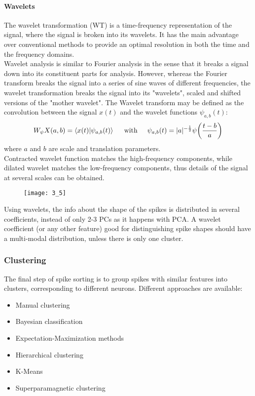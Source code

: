 \paragraph{Wavelets}
The wavelet transformation (WT) is a time-frequency representation of the signal, where the signal is broken into its wavelets. It has the main advantage over conventional methods to provide an optimal resolution in both the time and the frequency domains.\\
Wavelet analysis is similar to Fourier analysis in the sense that it breaks a signal down into its constituent parts for analysis. However, whereas the Fourier transform breaks the signal into a series of sine waves of different frequencies, the wavelet transformation breaks the signal into its "wavelets", scaled and shifted versions of the "mother wavelet".
The Wavelet transform may be defined as the convolution between the signal \(x(t)\) and the wavelet functions \(\psi_{a,b}(t)\):
\begin{align*}
    W_\psi X(a,b)=\left\langle x(t)|\psi_{a,b}(t) \right\rangle\hspace{0.5cm}\text{with}\hspace{0.5cm}\psi_{a,b}(t)=|a|^{-\frac{1}{2}}\psi\biggl(\frac{t-b}{a}\biggr)
\end{align*}
where \(a\) and \(b\) are scale and translation parameters.\\
Contracted wavelet function matches the high-frequency components, while dilated wavelet matches the low-frequency components, thus details of the signal at several scales can be obtained.
\begin{figure}[H]
    \texttt{[image: 3\_5]}
    \centering
\end{figure}
Using wavelets, the info about the shape of the spikes is distributed in several coefficients, instead of only 2-3 PCs as it happens with PCA. A wavelet coefficient (or any other feature) good for distinguishing spike shapes should have a multi-modal distribution, unless there is only one cluster.
\subsubsection{Clustering}
The final step of spike sorting is to group spikes with similar features into clusters, corresponding to different neurons. Different approaches are available:
\begin{itemize}
    \item Manual clustering
    \item Bayesian classification
    \item Expectation-Maximization methods
    \item Hierarchical clustering
    \item K-Means
    \item Superparamagnetic clustering
\end{itemize}
